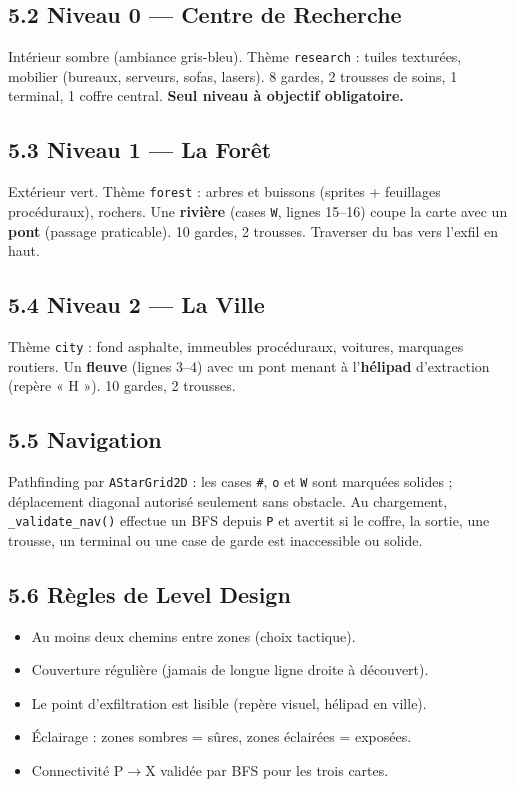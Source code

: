 \documentclass[11pt,a4paper]{article}
\newcommand{\code}[1]{\colorbox{codebg}{\texttt{#1}}}
\begin{document}
\subsection{5.2 Niveau 0 --- Centre de Recherche}
Int\'erieur sombre (ambiance gris-bleu). Th\`eme \code{research} : tuiles textur\'ees,
mobilier (bureaux, serveurs, sofas, lasers). 8 gardes, 2 trousses de soins, 1
terminal, 1 coffre central. \textbf{Seul niveau \`a objectif obligatoire.}

\subsection{5.3 Niveau 1 --- La For\^et}
Ext\'erieur vert. Th\`eme \code{forest} : arbres et buissons (sprites + feuillages
proc\'eduraux), rochers. Une \textbf{rivi\`ere} (cases \texttt{W}, lignes 15--16)
coupe la carte avec un \textbf{pont} (passage praticable). 10 gardes,
2 trousses. Traverser du bas vers l'exfil en haut.

\subsection{5.4 Niveau 2 --- La Ville}
Th\`eme \code{city} : fond asphalte, immeubles proc\'eduraux, voitures, marquages
routiers. Un \textbf{fleuve} (lignes 3--4) avec un pont menant \`a l'\textbf{h\'elipad}
d'extraction (rep\`ere « H »). 10 gardes, 2 trousses.

\subsection{5.5 Navigation}
Pathfinding par \code{AStarGrid2D} : les cases \texttt{\#}, \texttt{o} et \texttt{W}
sont marqu\'ees solides ; d\'eplacement diagonal autoris\'e seulement sans obstacle.
Au chargement, \code{\_validate\_nav()} effectue un BFS depuis \texttt{P} et avertit
si le coffre, la sortie, une trousse, un terminal ou une case de garde est
inaccessible ou solide.

\subsection{5.6 R\`egles de Level Design}
\begin{itemize}[leftmargin=*]
  \item Au moins deux chemins entre zones (choix tactique).
  \item Couverture r\'eguli\`ere (jamais de longue ligne droite \`a d\'ecouvert).
  \item Le point d'exfiltration est lisible (rep\`ere visuel, h\'elipad en ville).
  \item \'Eclairage : zones sombres = s\^ures, zones \'eclair\'ees = expos\'ees.
  \item Connectivit\'e P$\to$X valid\'ee par BFS pour les trois cartes.
\end{itemize}
\end{document}
